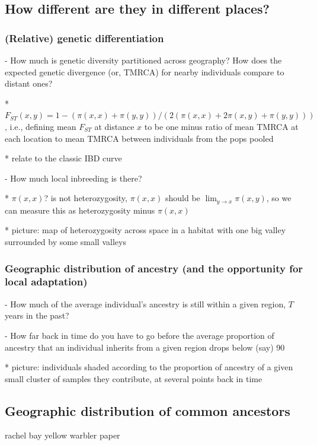 \documentclass{ar-1col}
\begin{document}
\subsection{How different are they in different places?}

\subsubsection{(Relative) genetic differentiation}

        - How much is genetic diversity partitioned across geography?
            How does the expected genetic divergence (or, TMRCA) for nearby individuals compare to distant ones?
            
            * $F_{ST}(x,y) = 1 - (\pi(x,x) + \pi(y,y))/(2 (\pi(x,x) + 2 \pi(x,y) + \pi(y,y)))$, 
                i.e., defining mean $F_{ST}$ at distance $x$ to be one minus ratio of mean TMRCA at each location
                to mean TMRCA between individuals from the pops pooled

            * relate to the classic IBD curve

        - How much local inbreeding is there?

            * $\pi(x,x)$? is not heterozygosity, $\pi(x,x)$ should be $\lim_{y \to x} \pi(x,y)$,
                so we can measure this as heterozygosity minus $\pi(x,x)$

            * picture: map of heterozygosity across space in a habitat with one big valley surrounded by some small valleys


\subsubsection{Geographic distribution of ancestry (and the opportunity for local adaptation)}

        - How much of the average individual's ancestry is still within a given region, $T$ years in the past?

        - How far back in time do you have to go before the average proportion of ancestry that an individual inherits
            from a given region drops below (say) 90%
            
            * picture: individuals shaded according to the proportion of ancestry of a given small cluster of samples
                they contribute, at several points back in time
                
\subsection{Geographic distribution of common ancestors}
	rachel bay yellow warbler paper
\end{document}
